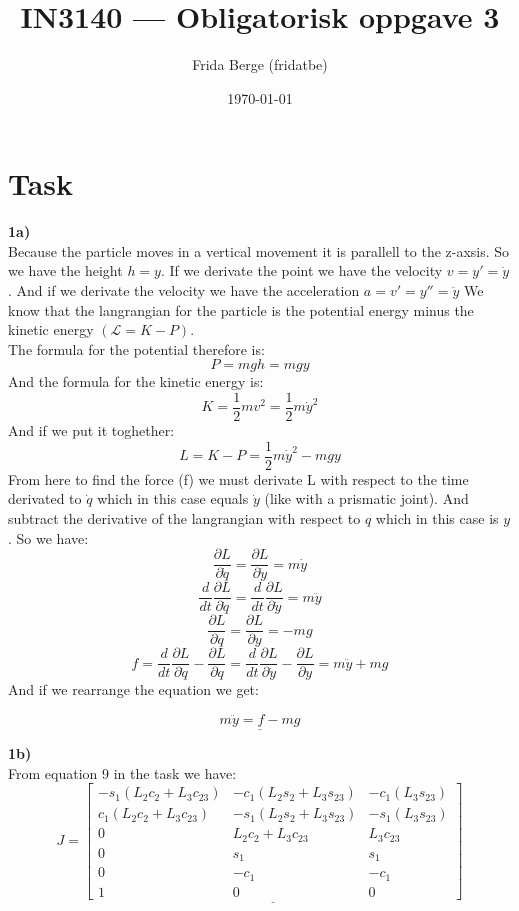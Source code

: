 \documentclass[12pt,norsk,a4paper]{article}
\author{Frida Berge (fridatbe)}
\title{IN3140 --- Obligatorisk oppgave 3}
\date{\today}
\begin{document}
    \maketitle
    \renewcommand{\thesubsection}{(\alph{subsection})}
    \newpage
    \section{Task}
    \textbf{1a)}\\
    Because the particle moves in a vertical movement it is parallell to the z-axsis. 
    So we have the height $h = y$. 
    If we derivate the point we have the velocity $v = y' = \dot y$.
    And if we derivate the velocity we have the acceleration $a = v' = y'' = \ddot y$
    We know that the langrangian for the particle is the potential energy minus the kinetic energy $(\mathcal{L} = K - P)$.\\
    The formula for the potential therefore is:
    \[P = mgh = mgy\]
    And the formula for the kinetic energy is:
    \[K = \frac{1}{2}mv^2 = \frac{1}{2}m\dot y^2\]
    And if we put it toghether:\\
    \[L = K-P = \frac{1}{2}m\dot y^2 - mgy\]
    From here to find the force (f) we must derivate L with respect to the time derivated to $\dot q$ which in this case equals $\dot y$ (like with a prismatic joint).
    And subtract the derivative of the langrangian with respect to $q$ which in this case is $y$.
    So we have:
    \[\frac{\partial L}{\partial \dot q} = \frac{\partial L}{\partial \dot y} = m\dot y\]
    \[\frac{d}{dt}\frac{\partial L}{\partial \dot q} = \frac{d}{dt}\frac{\partial L}{\partial \dot y} = m\ddot y\]
    \[\frac{\partial L}{\partial q} = \frac{\partial L}{\partial y} = -mg\]
    \[f = \frac{d}{dt}\frac{\partial L}{\partial \dot q} - \frac{\partial L}{\partial q} = \frac{d}{dt}\frac{\partial L}{\partial \dot y} - \frac{\partial L}{\partial y} = m\ddot y+mg\]
    And if we rearrange the equation we get:

    \[\underline{m\ddot y = f - mg}\]
    \newpage


    \textbf{1b)}\\

    From equation 9 in the task we have:\\
    \[J = \underline{\left[\begin{array}{ccc}
        -s_1(L_2c_2+L_3c_{23}) & -c_1(L_2s_2+L_3s_{23}) & -c_1(L_3s_{23})\\
        c_1(L_2c_2+L_3c_{23}) & -s_1(L_2s_2+L_3s_{23}) & -s_1(L_3s_{23})\\
        0 & L_2c_2+L_3c_{23} & L_3c_{23}\\
        0 & s_1 & s_1\\
        0 & -c_1 & -c_1\\
        1 & 0 & 0
    \end{array}\right]} \]
\end{document}
